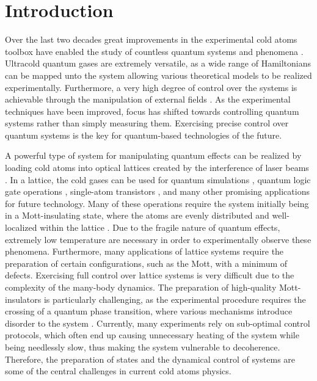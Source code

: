 \chapter{Introduction}
Over the last two decades great improvements in the experimental cold atoms toolbox have enabled the study of countless quantum systems and phenomena \cite{manybodyBloch,Bloch2012}. Ultracold quantum gases are extremely versatile, as a wide range of Hamiltonians can be mapped unto the system allowing various theoretical models to be realized experimentally. Furthermore, a very high degree of control over the systems is achievable through the manipulation of external fields \cite{JakschZoller}.
As the experimental techniques have been improved, focus has shifted towards controlling quantum systems rather than simply measuring them. Exercising precise control over quantum systems is the key for quantum-based technologies of the future.

A powerful type of system for manipulating quantum effects can be realized by loading cold atoms into optical lattices created by the interference of laser beams \cite{grimm}. In a lattice, the cold gases can be used for quantum simulations \cite{Jane2003,Jaksch2003}, quantum logic gate operations \cite{Zoller1999,Mandel2003,Jaksch2000}, single-atom transistors \cite{Micheli2004}, and many other promising applications for future technology. Many of these operations require the system initially being in a Mott-insulating state, where the atoms are evenly distributed and well-localized within the lattice \cite{lewenstein}.
Due to the fragile nature of quantum effects, extremely low temperature are necessary in order to experimentally observe these phenomena. Furthermore, many applications of lattice systems require the preparation of certain configurations, such as the Mott, with a minimum of defects. Exercising full control over lattice systems is very difficult due to the complexity of the many-body dynamics. The preparation of high-quality Mott-insulators is particularly challenging, as the experimental procedure requires the crossing of a quantum phase transition, where various mechanisms introduce disorder to the system \cite{Zurek2005,Braun2015}. Currently, many experiments rely on sub-optimal control protocols, which often end up causing unnecessary heating of the system while being needlessly slow, thus making the system vulnerable to decoherence.
Therefore, the preparation of states and the dynamical control of systems are some of the central challenges in current cold atoms physics.

